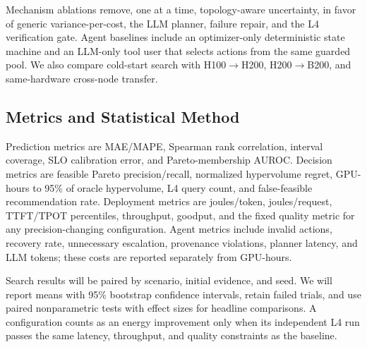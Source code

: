Mechanism ablations remove, one at a time, topology-aware uncertainty, \ipig{}
in favor of generic variance-per-cost, the LLM planner, failure repair, and the
L4 verification gate.  Agent baselines include an optimizer-only deterministic
state machine and an LLM-only tool user that selects actions from the same
guarded pool.  We also compare cold-start search with H100$\rightarrow$H200,
H200$\rightarrow$B200, and same-hardware cross-node transfer.

\subsection{Metrics and Statistical Method}

Prediction metrics are MAE/MAPE, Spearman rank correlation, interval coverage,
SLO calibration error, and Pareto-membership AUROC.  Decision metrics are
feasible Pareto precision/recall, normalized hypervolume regret, GPU-hours to
95\% of oracle hypervolume, L4 query count, and false-feasible recommendation
rate.  Deployment metrics are joules/token, joules/request, TTFT/TPOT
percentiles, throughput, goodput, and the fixed quality metric for any
precision-changing configuration.  Agent metrics include invalid actions,
recovery rate, unnecessary escalation, provenance violations, planner latency,
and LLM tokens; these costs are reported separately from GPU-hours.

Search results will be paired by scenario, initial evidence, and seed.  We will
report means with 95\% bootstrap confidence intervals, retain failed trials, and use
paired nonparametric tests with effect sizes for headline comparisons.  A
configuration counts as an energy improvement only when its independent L4
run passes the same latency, throughput, and quality constraints as the
baseline.
